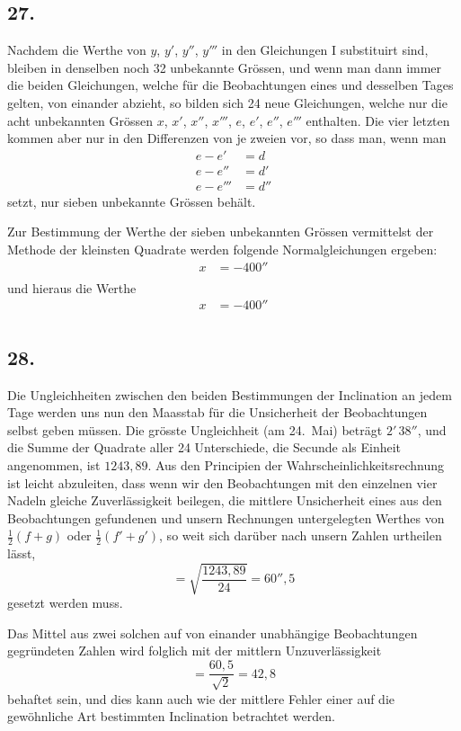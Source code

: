 \documentclass[12pt,a4paper]{article}
\begin{document}
\subsection*{27.}
Nachdem die Werthe von $y$, $y'$, $y''$, $y'''$ in den Gleichungen I substituirt sind, bleiben in denselben noch 32 unbekannte Grössen, und wenn man dann immer die beiden Gleichungen, welche für die Beobachtungen eines und desselben Tages gelten, von einander abzieht, so bilden sich 24 neue Gleichungen, welche nur die acht unbekannten Grössen $x$, $x'$, $x''$, $x'''$, $e$, $e'$, $e''$, $e'''$ enthalten. Die vier letzten kommen aber nur in den Differenzen von je zweien vor, so dass man, wenn man
\begin{align*}
e - e' &= d \\
e - e'' &= d' \\
e - e''' &= d''
\end{align*}
setzt, nur sieben unbekannte Grössen behält.

Zur Bestimmung der Werthe der sieben unbekannten Grössen vermittelst der Methode der kleinsten Quadrate werden folgende Normalgleichungen ergeben:
\begin{align*}
x &= -400'' \\
\end{align*}
und hieraus die Werthe
\begin{align*}
x &= -400'' \\
\end{align*}

\subsection*{28.}
Die Ungleichheiten zwischen den beiden Bestimmungen der Inclination an jedem Tage werden uns nun den Maasstab für die Unsicherheit der Beobachtungen selbst geben müssen. Die grösste Ungleichheit (am 24.~Mai) beträgt $2'\,38''$, und die Summe der Quadrate aller 24 Unterschiede, die Secunde als Einheit angenommen, ist $1243{,}89$. Aus den Principien der Wahrscheinlichkeitsrechnung ist leicht abzuleiten, dass wenn wir den Beobachtungen mit den einzelnen vier Nadeln gleiche Zuverlässigkeit beilegen, die mittlere Unsicherheit eines aus den Beobachtungen gefundenen und unsern Rechnungen untergelegten Werthes von $\tfrac{1}{2}(f + g)$ oder $\tfrac{1}{2}(f' + g')$, so weit sich darüber nach unsern Zahlen urtheilen lässt,
\[ = \sqrt{\frac{1243{,}89}{24}} = 60''{,}5 \]
gesetzt werden muss.

Das Mittel aus zwei solchen auf von einander unabhängige Beobachtungen gegründeten Zahlen wird folglich mit der mittlern Unzuverlässigkeit
\[ = \frac{60{,}5}{\sqrt{2}} = 42{,}8 \]
behaftet sein, und dies kann auch wie der mittlere Fehler einer auf die gewöhnliche Art bestimmten Inclination betrachtet werden.
\end{document}

